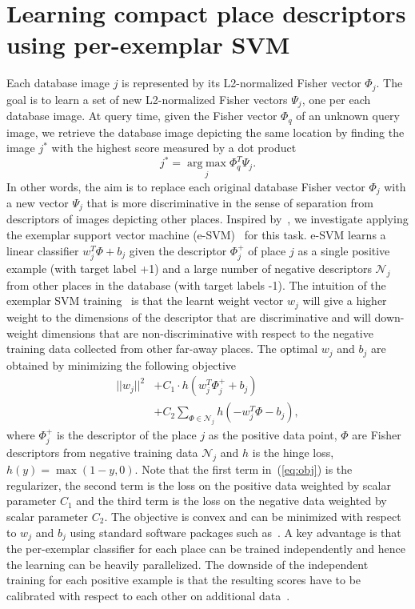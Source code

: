 \documentclass[10pt,twocolumn,letterpaper]{article}
\begin{document}
\section{Learning compact place descriptors using per-exemplar SVM}
\label{sec:perExemplar}
   Each database image $j$ is represented by its L2-normalized Fisher vector $\Phi_j$. The goal is to learn a set of new L2-normalized Fisher vectors $\Psi_j$, one per each database image.
   At query time, given the Fisher vector $\Phi_q$ of an unknown query image, we retrieve the database image depicting the same location by finding the image $j^*$ with the highest score measured by a dot product
   \begin{equation}
       j^*=\operatorname*{arg\;max}_{j} \Phi_q^T \Psi_j. 
       \label{eq:class}
   \end{equation}
   In other words, the aim is to replace each original database Fisher vector $\Phi_j$ with a new vector $\Psi_j$ that is more discriminative in the sense of separation from descriptors of images depicting other places. Inspired by~\cite{Gronat13}, we investigate applying the exemplar support vector machine (e-SVM)~\cite{Malisiewicz11} for this task. e-SVM learns a linear classifier $w_j^T\Phi+b_j$ given the descriptor $\Phi_j^+$ of place $j$ as a single positive example (with target label +1) and a large number of negative descriptors $\mathcal N_j$ from other places in the database (with target labels -1). The intuition of the exemplar SVM training~\cite{Malisiewicz11} is that the learnt weight vector $w_j$ will give a higher weight to the dimensions of the descriptor that are discriminative and will down-weight dimensions that are non-discriminative with respect to the negative training data collected from other far-away places.  The optimal $w_j$ and $b_j$ are obtained by minimizing the following objective  
      \begin{align}
         \label{eq:obj}
         ||w_j||^{2} &+C_1 \cdot h
            \left(
               w_j^T\Phi^+_j+b_j
            \right)  \\ \nonumber
            &+C_2\sum_{\Phi\in \mathcal N_j}h
            \left(
               -w_j^T\Phi-b_j
            \right),    
      \end{align}
   where $\Phi^+_j$ is the descriptor of the place $j$ as the positive data point, $\Phi$ are Fisher descriptors from negative training data $\mathcal N_j$ and $h$ is the hinge loss, $h(y) = \max(1-y,0)$. Note that the first term in~(\ref{eq:obj}) is the regularizer, the second term is the loss on the positive data weighted by scalar parameter $C_1$ and the third term is the loss on the negative data weighted by scalar parameter $C_2$. The objective is convex and can be minimized with respect to $w_j$ and $b_j$ using standard software packages such as~\cite{libsvm}. A key advantage is that the per-exemplar classifier for each place can be trained independently and hence the learning can be heavily parallelized. The downside of the independent training for each positive example is that the resulting scores have to be calibrated with respect to each other on additional data~\cite{Gronat13,Malisiewicz11}.
   
\end{document}
